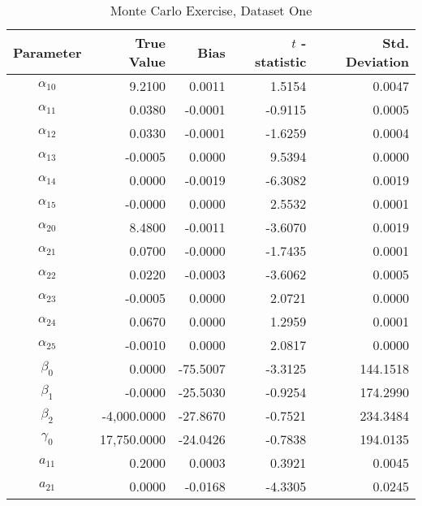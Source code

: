 \begin{table}\onehalfspacing
\begin{center}
\begin{threeparttable}
  \caption{Monte Carlo Exercise, Dataset One}
  \label{Monte Carlo: One}
  \begin{tabular}{crrrr}\toprule

  Parameter & True Value & Bias & $t$ - statistic & Std. Deviation \\
  \midrule
  $\alpha_{10}$ &     \phantom{20000}9.2100 &    \phantom{-17}0.0011 &     1.5154 &      0.0047 \\
  $\alpha_{11}$ &     0.0380 &     -0.0001 &      -0.9115 &       0.0005 \\
  $\alpha_{12}$ &     0.0330 &     -0.0001 &     -1.6259 &       0.0004 \\
  $\alpha_{13}$ &    -0.0005 &      0.0000 &     9.5394 &       0.0000 \\
  $\alpha_{14}$ &     0.0000 &     -0.0019 &     -6.3082 &       0.0019 \\
  $\alpha_{15}$ &    -0.0000 &      0.0000 &      2.5532 &       0.0001 \\
  $\alpha_{20}$ &     8.4800 &     -0.0011 &     -3.6070 &       0.0019 \\
  $\alpha_{21}$ &     0.0700 &     -0.0000 &     -1.7435 &       0.0001 \\
  $\alpha_{22}$ &     0.0220 &     -0.0003  &        -3.6062  &        0.0005 \\
  $\alpha_{23}$ &    -0.0005 &     0.0000  &        2.0721  &        0.0000\\
  $\alpha_{24}$ &     0.0670 &     0.0000  &       1.2959  &        0.0001 \\
  $\alpha_{25}$ &    -0.0010 &     0.0000  &        2.0817  &        0.0000\\
  $\beta_{0}$   &     0.0000 &    -75.5007 &     -3.3125 &     144.1518 \\
  $\beta_{1}$   &    -0.0000 &     -25.5030 &     -0.9254 &     174.2990 \\
  $\beta_{2}$   &  -4,000.0000 &   -27.8670 &     -0.7521 &     234.3484 \\
  $\gamma_{0}$  & 17,750.0000 &   -24.0426 &     -0.7838 &     194.0135 \\
  $a_{11}$      &     0.2000 &     0.0003 &     0.3921 &       0.0045 \\
  $a_{21}$      &     0.0000 &     -0.0168 &     -4.3305 &       0.0245 \\

\end{tabular}
\end{threeparttable}
\end{center}
\end{table}
